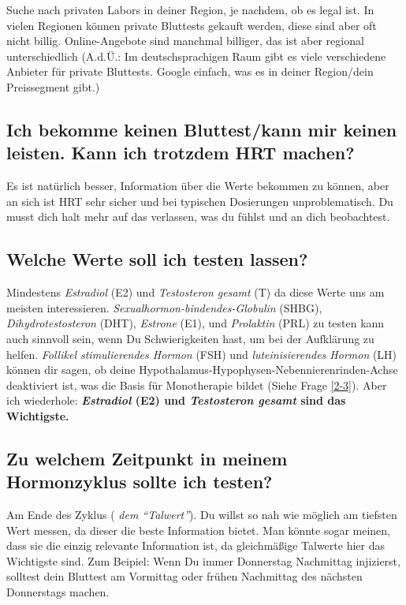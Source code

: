 \documentclass{article}
\begin{document}
{Suche nach privaten Labors in deiner Region, je nachdem, ob es legal ist. In vielen Regionen können private Bluttests gekauft werden, diese sind aber oft nicht billig. Online-Angebote sind manchmal billiger, das ist aber regional unterschiedlich (A.d.Ü.: Im deutschsprachigen Raum gibt es viele verschiedene Anbieter für private Bluttests. Google einfach, was es in deiner Region/dein Preissegment gibt.)

\subsection{Ich bekomme keinen Bluttest/kann mir keinen leisten. Kann ich trotzdem HRT machen?}

Es ist natürlich besser, Information über die Werte bekommen zu können, aber an sich ist HRT sehr sicher und bei typischen Dosierungen unproblematisch. Du musst dich halt mehr auf das verlassen, was du fühlst und an dich beobachtest.

\subsection{Welche Werte soll ich testen lassen?}

Mindestens \textit{Estradiol} (E2) und \textit{Testosteron gesamt} (T) da diese Werte uns am meisten interessieren. \textit{Sexualhormon-bindendes-Globulin} (SHBG), \textit{Dihydrotestosteron} (DHT), \textit{Estrone} (E1), und \textit{Prolaktin }(PRL) zu testen kann auch sinnvoll sein, wenn Du Schwierigkeiten hast, um bei der Aufklärung zu helfen. \textit{Follikel stimulierendes Hormon} (FSH) und \textit{luteinisierendes Hormon} (LH) können dir sagen, ob deine Hypothalamus-Hypophysen-Nebennierenrinden-Achse deaktiviert ist, was die Basis für Monotherapie bildet (Siehe Frage \ref{2-3}). Aber ich wiederhole: \textbf{\textit{Estradiol} (E2) und \textit{Testosteron gesamt} sind das Wichtigste. }

\subsection{Zu welchem Zeitpunkt in meinem Hormonzyklus sollte ich testen?}

Am Ende des Zyklus (\textit{ dem “Talwert”}). Du willst so nah wie möglich am tiefsten Wert messen, da dieser die beste Information bietet. Man könnte sogar meinen, dass sie die einzig relevante Information ist, da gleichmäßige Talwerte hier das Wichtigste sind. Zum Beipiel: Wenn Du immer Donnerstag Nachmittag injizierst, solltest dein Bluttest am Vormittag oder frühen Nachmittag des nächsten Donnerstags machen.

}
\end{document}
